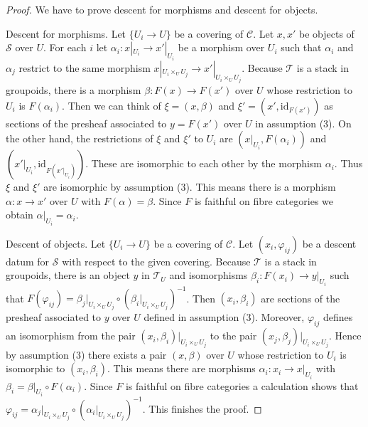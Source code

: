 \documentclass{stacks-project}
\theoremstyle{plain}
\theoremstyle{definition}
\theoremstyle{remark}
\numberwithin{equation}{subsection}
\begin{document}
\begin{proof}
We have to prove descent for morphisms and descent for objects.

\medskip\noindent
Descent for morphisms. Let $\{U_i \to U\}$ be a covering of $\mathcal{C}$.
Let $x, x'$ be objects of $\mathcal{S}$ over $U$. For each $i$
let $\alpha_i : x|_{U_i} \to x'|_{U_i}$ be a morphism over $U_i$
such that $\alpha_i$ and $\alpha_j$ restrict to the same morphism
$x|_{U_i \times_U U_j} \to x'|_{U_i \times_U U_j}$.
Because $\mathcal{T}$ is a stack in groupoids, there is a morphism
$\beta : F(x) \to F(x')$ over $U$ whose restriction to $U_i$ is $F(\alpha_i)$.
Then we can think of $\xi = (x, \beta)$ and $\xi' = (x', \text{id}_{F(x')})$
as sections of the presheaf associated to $y = F(x')$ over $U$
in assumption (3). On the other hand, the restrictions of
$\xi$ and $\xi'$ to $U_i$ are $(x|_{U_i}, F(\alpha_i))$
and $(x'|_{U_i}, \text{id}_{F(x'|_{U_i})})$.
These are isomorphic to each other by the morphism $\alpha_i$.
Thus $\xi$ and $\xi'$ are isomorphic by assumption (3). This means there is a
morphism $\alpha : x \to x'$ over $U$ with $F(\alpha) = \beta$.
Since $F$ is faithful on fibre categories we obtain
$\alpha|_{U_i} = \alpha_i$.

\medskip\noindent
Descent of objects. Let $\{U_i \to U\}$ be a covering of $\mathcal{C}$.
Let $(x_i, \varphi_{ij})$ be a descent datum for $\mathcal{S}$ with
respect to the given covering. Because $\mathcal{T}$ is a stack in groupoids,
there is an object $y$ in $\mathcal{T}_U$ and isomorphisms
$\beta_i : F(x_i) \to y|_{U_i}$ such that
$F(\varphi_{ij}) = \beta_j|_{U_i \times_U U_j} \circ
(\beta_i|_{U_i \times_U U_j})^{-1}$.
Then $(x_i, \beta_i)$ are sections of the presheaf associated to
$y$ over $U$ defined in assumption (3).
Moreover, $\varphi_{ij}$ defines an isomorphism
from the pair $(x_i, \beta_i)|_{U_i \times_U U_j}$ to 
the pair $(x_j, \beta_j)|_{U_i \times_U U_j}$.
Hence by assumption (3) there exists a pair $(x, \beta)$ over $U$
whose restriction to $U_i$ is isomorphic to $(x_i, \beta_i)$.
This means there are morphisms $\alpha_i : x_i \to x|_{U_i}$
with $\beta_i = \beta|_{U_i} \circ F(\alpha_i)$.
Since $F$ is faithful on fibre categories a calculation shows
that $\varphi_{ij} = \alpha_j|_{U_i \times_U U_j} \circ
(\alpha_i|_{U_i \times_U U_j})^{-1}$. This finishes the proof.
\end{proof}
\end{document}
